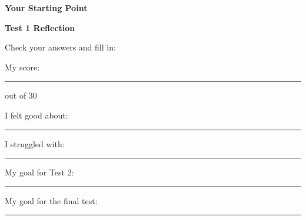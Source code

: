 \clearpage
\thispagestyle{empty}
{\sffamily

\begin{center}
{\fontsize{22}{26}\selectfont\bfseries\color{funBlue} \faChartBar\hspace{3mm}Your Starting Point\hspace{3mm}\faChartBar}

\vspace{2mm}
{\color{funGray}\hrulefill}
\end{center}

\vspace{3mm}

\begin{tcolorbox}[
    enhanced,
    colback=funBlueLight,
    colframe=funBlue!50,
    arc=10pt,
    boxrule=1.5pt,
    left=6mm, right=6mm, top=5mm, bottom=5mm,
]
{\large\bfseries\color{funBlueDark} \faClipboardList\hspace{2mm}Test 1 Reflection}

\vspace{2mm}

Check your answers and fill in:

\vspace{3mm}

\faCheckCircle\hspace{2mm}My score: \rule[-2pt]{1.5cm}{0.5pt} out of 30

\vspace{2mm}

\faSmile\hspace{2mm}I felt good about: \rule[-2pt]{6cm}{0.5pt}

\vspace{2mm}

\faFrown\hspace{2mm}I struggled with: \rule[-2pt]{5.5cm}{0.5pt}

\vspace{2mm}

\faBullseye\hspace{2mm}My goal for Test 2: \rule[-2pt]{5.5cm}{0.5pt}

\vspace{2mm}

\faTrophy\hspace{2mm}My goal for the final test: \rule[-2pt]{5cm}{0.5pt}
\end{tcolorbox}

\vspace{3mm}

}
